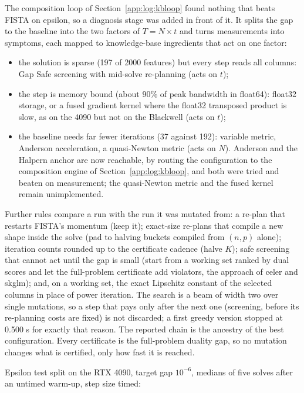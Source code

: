 The composition loop of Section~\ref{app:log:kbloop} found nothing that beats
FISTA on epsilon, so a diagnosis stage was added in front of it. It splits the
gap to the baseline into the two factors of $T = N \times t$ and turns
measurements into symptoms, each mapped to knowledge-base ingredients that act
on one factor:
\begin{itemize}
\item the solution is sparse (197 of 2000 features) but every step reads all
 columns: Gap Safe screening with mid-solve re-planning (acts on $t$);
\item the step is memory bound (about 90\% of peak bandwidth in float64):
 float32 storage, or a fused gradient kernel where the float32 transposed
 product is slow, as on the 4090 but not on the Blackwell (acts on $t$);
\item the baseline needs far fewer iterations (37 against 192): variable
 metric, Anderson acceleration, a quasi-Newton metric (acts on $N$). Anderson
 and the Halpern anchor are now reachable, by routing the configuration to the
 composition engine of Section~\ref{app:log:kbloop}, and both were tried and
 beaten on measurement; the quasi-Newton metric and the fused kernel remain
 unimplemented.
\end{itemize}
Further rules compare a run with the run it was mutated from: a re-plan that
restarts FISTA's momentum (keep it); exact-size re-plans that compile a new
shape inside the solve (pad to halving buckets compiled from $(n, p)$ alone);
iteration counts rounded up to the certificate cadence (halve $K$); safe
screening that cannot act until the gap is small (start from a working set
ranked by dual scores and let the full-problem certificate add violators, the
approach of celer and skglm); and, on a working set, the exact Lipschitz
constant of the selected columns in place of power iteration. The search is a
beam of width two over single mutations, so a step that pays only after the
next one (screening, before its re-planning costs are fixed) is not discarded;
a first greedy version stopped at 0.500 s for exactly that reason. The
reported chain is the ancestry of the best configuration. Every certificate is
the full-problem duality gap, so no mutation changes what is certified, only how
fast it is reached.

Epsilon test split on the RTX 4090, target gap $10^{-6}$, medians of five
solves after an untimed warm-up, step size timed:

